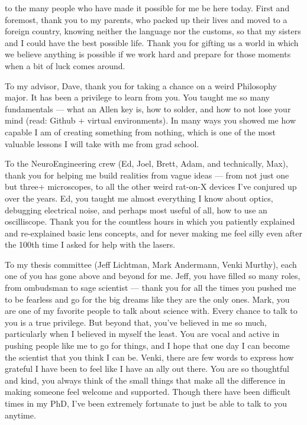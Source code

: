 
 to the many people who have made it possible for me be here today. First and foremost, thank you to my parents, who packed up their lives and moved to a foreign country, knowing neither the language nor the customs, so that my sisters and I could have the best possible life. Thank you for gifting us a world in which we believe anything is possible if we work hard and prepare for those moments when a bit of luck comes around. 

To my advisor, Dave, thank you for taking a chance on a weird Philosophy major. It has been a privilege to learn from you. You taught me so many fundamentals — what an Allen key is, how to solder, and how to not lose your mind (read: Github + virtual environments). In many ways you showed me how capable I am of creating something from nothing, which is one of the most valuable lessons I will take with me from grad school. 

To the NeuroEngineering crew (Ed, Joel, Brett, Adam, and technically, Max), thank you for helping me build realities from  vague ideas --- from not just one but three+ microscopes, to all the other weird rat-on-X devices I’ve conjured up over the years. Ed, you taught me almost everything I know about optics, debugging electrical noise, and perhaps most useful of all, how to use an oscilliscope. Thank you for the countless hours in which you patiently explained and re-explained basic lens concepts, and for never making me feel silly even after the 100th time I asked for help with the lasers. 

To my thesis committee (Jeff Lichtman, Mark Andermann, Venki Murthy), each one of you has gone above and beyond for me. Jeff, you have filled so many roles, from ombudsman to sage scientist — thank you for all the times you pushed me to be fearless and go for the big dreams like they are the only ones. Mark, you are one of my favorite people to talk about science with. Every chance to talk to you is a true privilege. But beyond that, you’ve believed in me so much, particularly when I believed in myself the least. You are vocal and active in pushing people like me to go for things, and I hope that one day I can become the scientist that you think I can be. Venki, there are few words to express how grateful I have been to feel like I have an ally out there. You are so thoughtful and kind, you always think of the small things that make all the difference in making someone feel welcome and supported. Though there have been difficult times in my PhD, I’ve been extremely fortunate to just be able to talk to you anytime. 

